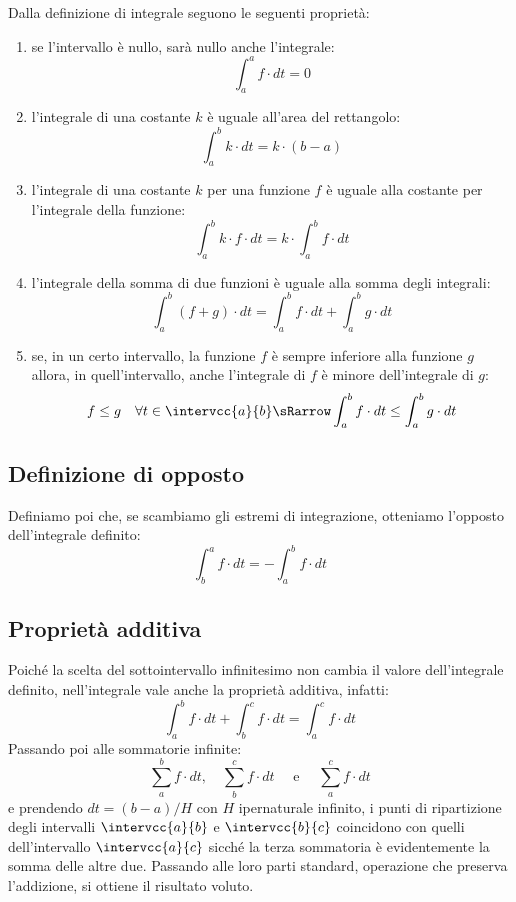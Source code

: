 Dalla definizione di integrale seguono le seguenti proprietà:
\begin{enumerate}
 \item se l'intervallo è nullo, sarà nullo anche l'integrale:
\[\int_a^a f \cdot dt=0\] 
 \item l'integrale di una costante \(k\) è uguale all'area del rettangolo:
\[\int_a^b k \cdot dt = k \cdot (b-a)\]
 \item l'integrale di una costante \(k\) per una funzione \(f\) è uguale alla 
costante per l'integrale della funzione:
\[\int_a^b k \cdot f \cdot dt = k\cdot\int_a^b f \cdot dt\]
 \item l'integrale della somma di due funzioni è uguale alla somma degli 
integrali:
\[\int_a^b (f+g)\cdot dt = \int_a^b f \cdot dt + \int_a^b g\cdot dt\]
 \item se, in un certo intervallo, la funzione \(f\) è sempre inferiore alla 
funzione \(g\) allora, in quell'intervallo, anche l'integrale di \(f\) è 
minore dell'integrale di \(g\):
\[f \le g \quad \forall t \in \intervcc{a}{b} \sRarrow 
\int_a^b f \cdot dt \le \int_a^b g\cdot dt\]
\end{enumerate}

\subsection{Definizione di opposto}
\label{subsec:integrali_opposto}

Definiamo poi che, se scambiamo gli estremi di integrazione, otteniamo 
l'opposto dell'integrale definito:
\[\int_b^a f \cdot dt = - \int_a^b f \cdot dt\]

\subsection{Proprietà additiva}
\label{subsec:integrali_proprieta_additiva}

Poiché la scelta del sottointervallo infinitesimo non cambia il valore 
dell'integrale definito, 
nell'integrale vale anche la proprietà additiva, infatti: 
\[\int_a^b f \cdot dt + \int_b^c f \cdot dt = \int_a^c f \cdot 
dt\] 
Passando poi alle sommatorie infinite:
\[\sum_a^b f \cdot dt,\quad \sum_b^c f \cdot dt \quad\text{ e } \quad 
  \sum_a^c f \cdot dt\] 
e prendendo 
\(dt = (b-a)/H\)
con \(H\) ipernaturale infinito, 
i punti di ripartizione degli intervalli \(\intervcc{a}{b}\) e 
\(\intervcc{b}{c}\) coincidono con quelli dell'intervallo \(\intervcc{a}{c}\)
sicché la terza sommatoria è evidentemente la somma delle altre due.
Passando alle loro parti standard, operazione che preserva l'addizione, si 
ottiene il risultato voluto.

